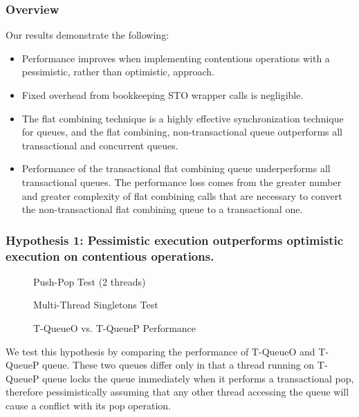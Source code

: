 \subsubsection{Overview}
Our results demonstrate the following:
\begin{itemize}
    \item Performance improves when implementing contentious operations with a pessimistic, rather than optimistic, approach.
    \item Fixed overhead from bookkeeping STO wrapper calls is negligible.
    \item The flat combining technique is a highly effective synchronization technique for queues, and the flat combining, non-transactional queue outperforms all transactional and concurrent queues.
    \item Performance of the transactional flat combining queue underperforms all transactional queues. The performance loss comes from the greater number and greater complexity of flat combining calls that are necessary to convert the non-transactional flat combining queue to a transactional one.
\end{itemize}


\subsubsection{Hypothesis 1: Pessimistic execution outperforms optimistic execution on contentious operations.}
\begin{figure}[H]
    \centering
	\begin{minipage}{0.75\textwidth}
        \caption*{Push-Pop Test (2 threads)}
        \vspace{12pt}
	\end{minipage}
	\begin{minipage}{0.75\textwidth}
        \caption*{Multi-Thread Singletons Test}
	\end{minipage}
    \caption{T-QueueO vs. T-QueueP Performance}
    \label{fig:stoqs}
\end{figure}


We test this hypothesis by comparing the performance of T-QueueO and T-QueueP queue. These two queues differ only in that a thread running on T-QueueP queue locks the queue immediately when it performs a transactional pop, therefore pessimistically assuming that any other thread accessing the queue will cause a conflict with its pop operation.

